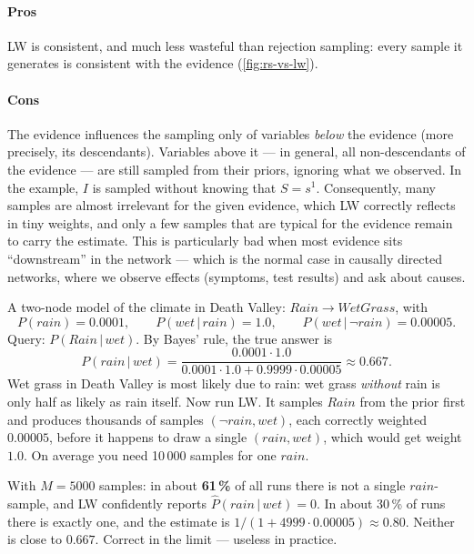 \documentclass[11pt, oneside]{book}
\newcommand{\Prob}{\mathbb{P}}           %
\newcommand{\given}{\,\vert\,}           %
\newcommand{\vn}[1]{\mathit{#1}}         %
\begin{document}
\paragraph{Pros} LW is consistent, and much less wasteful than rejection
sampling: every sample it generates is consistent with the evidence
(\cref{fig:rs-vs-lw}).

\paragraph{Cons} The evidence influences the sampling only of variables
\emph{below} the evidence (more precisely, its descendants). Variables above
it --- in general, all non-descendants of the evidence --- are still sampled
from their priors, ignoring what we observed. In the example, $I$ is sampled
without knowing that $S = s^1$. Consequently, many samples are almost
irrelevant for the given evidence, which LW correctly reflects in tiny
weights, and only a few samples that are typical for the evidence remain to
carry the estimate. This is particularly bad when most evidence sits
``downstream'' in the network --- which is the normal case in causally
directed networks, where we observe effects (symptoms, test results) and ask
about causes.

\begin{exbox}[title={An extreme example: rain in Death Valley}]
A two-node model of the climate in Death Valley: $\vn{Rain} \to
\vn{WetGrass}$, with
\[
P(\vn{rain}) = 0.0001, \qquad P(\vn{wet} \given \vn{rain}) = 1.0, \qquad
P(\vn{wet} \given \neg\vn{rain}) = 0.00005 .
\]
Query: $P(\vn{Rain} \given \vn{wet})$. By Bayes' rule, the true answer is
\[
P(\vn{rain} \given \vn{wet}) = \frac{0.0001 \cdot 1.0}{0.0001 \cdot 1.0 + 0.9999 \cdot 0.00005} \approx 0.667 .
\]
Wet grass in Death Valley is most likely due to rain: wet grass \emph{without}
rain is only half as likely as rain itself. Now run LW. It samples $\vn{Rain}$ from the
prior first and produces thousands of samples $(\neg\vn{rain}, \vn{wet})$,
each correctly weighted $0.00005$, before it happens to draw a single
$(\vn{rain}, \vn{wet})$, which would get weight $1.0$. On average you need
10\,000 samples for one $\vn{rain}$.\par\smallskip
With $M = 5000$ samples: in about \textbf{61\,\%} of all runs there is not a
single $\vn{rain}$-sample, and LW confidently reports
$\hat P(\vn{rain} \given \vn{wet}) = 0$. In about 30\,\% of runs there is
exactly one, and the estimate is $1/(1 + 4999 \cdot 0.00005) \approx 0.80$.
Neither is close to $0.667$. Correct in the limit --- useless in practice.
\end{exbox}
\end{document}
